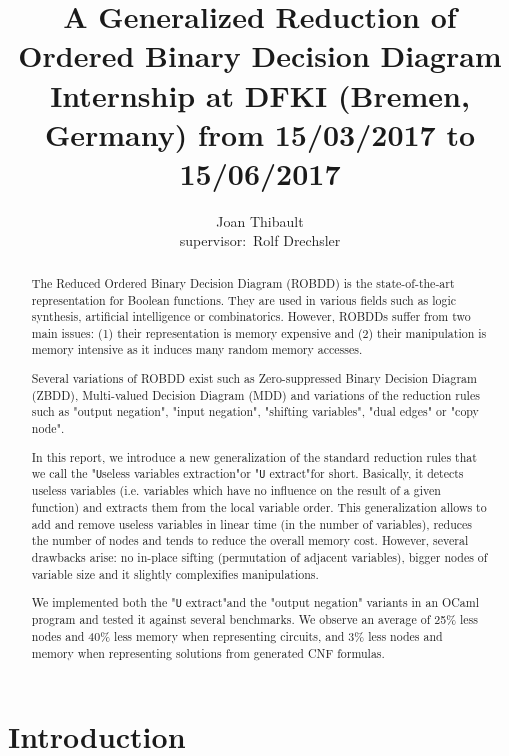 \documentclass[a4paper,10pt]{article}
\title{A Generalized Reduction of Ordered Binary Decision Diagram\\{\small Internship at DFKI (Bremen, Germany) from 15/03/2017 to 15/06/2017}}
\author{Joan Thibault\\supervisor:~Rolf Drechsler}
\newcommand{\Uextract}{"\texttt{U}seless variables extraction"}
\newcommand{\uextract}{"\texttt{U} extract"}
\begin{document}
\maketitle
\begin{abstract}
The Reduced Ordered Binary Decision Diagram (ROBDD)\cite{Bryant1986, Somenzi1999} is the state-of-the-art representation for Boolean functions.
They are used in various fields such as logic synthesis, artificial intelligence or combinatorics.
However, ROBDDs suffer from two main issues: (1) their representation is memory expensive and (2) their manipulation is memory intensive as it induces many random memory accesses.


Several variations of ROBDD exist such as Zero-suppressed Binary Decision Diagram (ZBDD)\cite{IntroZDD}, Multi-valued Decision Diagram (MDD)\cite{IntroMDD, IntroMddRolf} and variations of the reduction rules such as "output negation"\cite{BryantVariantN}, "input negation"\cite{MinatoVariants}, "shifting variables"\cite{MinatoVariants}, "dual edges"\cite{RolfVariantDual} or "copy node"\cite{RolfVariantCopy}.


In this report, we introduce a new generalization of the standard reduction rules that we call the \Uextract or \uextract for short.
Basically, it detects useless variables (i.e. variables which have no influence on the result of a given function) and extracts them from the local variable order.
This generalization allows to add and remove useless variables in linear time (in the number of variables), reduces the number of nodes and tends to reduce the overall memory cost.
However, several drawbacks arise: no in-place sifting (permutation of adjacent variables), bigger nodes of variable size and it slightly complexifies manipulations.


We implemented both the \uextract and the "output negation" variants in an OCaml program\cite{DAGamlGitHub} and tested it against several benchmarks\cite{BenchSatlib, BenchLgsynth91, BenchIscas99}.
We observe an average of 25\% less nodes and 40\% less memory when representing circuits, and 3\% less nodes and memory when representing solutions from generated CNF formulas.
\end{abstract}

\newpage



\section{Introduction}
\end{document}
